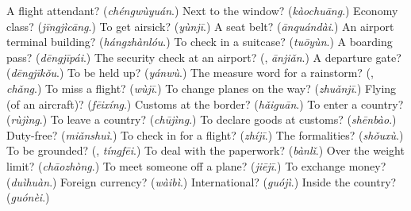 \begin{tcolorbox}[breakable,colback=teal!4,colframe=teal!35!black,title={Before you move on}]
A flight attendant? (\emph{chéngwùyuán}.) Next to the window? (\emph{kàochuāng}.) Economy class? (\emph{jīngjìcāng}.) To get airsick? (\emph{yùnjī}.) A seat belt? (\emph{ānquándài}.) An airport terminal building? (\emph{hángzhànlóu}.) To check in a suitcase? (\emph{tuōyùn}.) A boarding pass? (\emph{dēngjīpái}.) The security check at an airport? (\textbf{}, \emph{ānjiǎn}.) A departure gate? (\emph{dēngjīkǒu}.) To be held up? (\emph{yánwù}.) The measure word for a rainstorm? (\textbf{}, \emph{chǎng}.) To miss a flight? (\emph{wùjī}.) To change planes on the way? (\emph{zhuǎnjī}.) Flying (of an aircraft)? (\emph{fēixíng}.) Customs at the border? (\emph{hǎiguān}.) To enter a country? (\emph{rùjìng}.) To leave a country? (\emph{chūjìng}.) To declare goods at customs? (\emph{shēnbào}.) Duty-free? (\emph{miǎnshuì}.) To check in for a flight? (\emph{zhíjī}.) The formalities? (\emph{shǒuxù}.) To be grounded? (\textbf{}, \emph{tíngfēi}.) To deal with the paperwork? (\emph{bànlǐ}.) Over the weight limit? (\emph{chāozhòng}.) To meet someone off a plane? (\emph{jiējī}.) To exchange money? (\emph{duìhuàn}.) Foreign currency? (\emph{wàibì}.) International? (\emph{guójì}.) Inside the country? (\emph{guónèi}.)
\end{tcolorbox}
